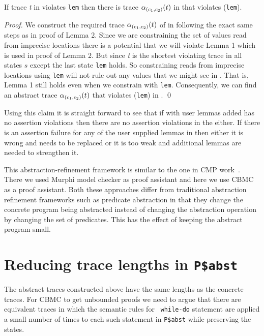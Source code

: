 \begin{lemma}

  If trace \emph{t} in \prog{} violates {\tt lem} then there is trace
  \(\alpha_{(c_1,c_2)}(t)\) in \progabst{} that violates \trrd({\tt lem}).
  
\end{lemma}

\begin{proof}

 We construct the required trace \(\alpha_{(c_1,c_2)}(t)\) of in \progabst{}
 following the exact same steps as in proof of Lemma 2. Since we are
 constraining the set of values read from imprecise locations there is a
 potential that we will violate Lemma 1 which is used in proof of
 Lemma 2. But since \emph{t} is the shortest violating trace in all
 states \(s\) except the last state {\tt lem} holds. So constraining
 reads from imprecise locations using {\tt lem} will not rule out any
 values that we might see in \prog. That is, Lemma 1 still holds even
 when we constrain \progabst with {\tt lem}. Consequently, we can
 find an abstract trace \(\alpha_{(c_1,c_2)}(t)\) that violates \trrd({\tt lem}) in
 \progabst. \qed
  
\end{proof}

Using this claim it is straight forward to see that if \progabst with
user lemmas added has no assertion violations then there are no
assertion violations in the \prog either. If there is an assertion
failure for any of the user supplied lemmas in \progabst{} then either
it is wrong and needs to be replaced or it is too weak and additional
lemmas are needed to strengthen it.

This abstraction-refinement framework is similar to the one in CMP
work~\cite{self}. There we used Murphi model checker as proof
assistant and here we use CBMC as a proof assistant. Both these
approaches differ from traditional abstraction refinement frameworks
such as predicate abstraction in that they change the concrete program
being abstracted instead of changing the abstraction operation by
changing the set of predicates. This has the effect of keeping the
abstract program small.

\section{Reducing trace lengths in {\tt P\$abst}}

 The abstract traces constructed above have the same lengths as the
 concrete traces. For CBMC to get unbounded proofs we need to argue
 that there are equivalent traces in which the semantic rules for {\tt
   while-do} statement are applied a small number of times to each
 such statement in {\tt P\$abst} while preserving the states.
 
